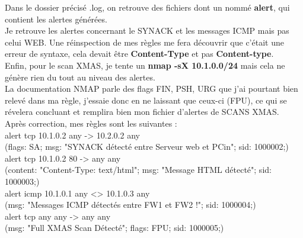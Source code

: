 \documentclass[a4paper,10pt,final,fleqn]{article}
\begin{document}
		Dans le dossier précisé .log, on retrouve des fichiers dont un nommé \textbf{alert}, qui contient les alertes générées.\\
		Je retrouve les alertes concernant le SYNACK et les messages ICMP mais pas celui WEB. Une réinspection de mes règles me fera découvrir que c'était une erreur de syntaxe, cela devait être \textbf{Content-Type} et pas \textbf{Content-type}.\\

		Enfin, pour le scan XMAS, je tente un \textbf{nmap -sX 10.1.0.0/24} mais cela ne génère rien du tout au niveau des alertes.\\
		La documentation NMAP parle des flags FIN, PSH, URG que j'ai pourtant bien relevé dans ma règle, j'essaie donc en ne laissant que ceux-ci (FPU), ce qui se révelera concluant et remplira bien mon fichier d'alertes de SCANS XMAS.\\

		Après correction, mes règles sont les suivantes : \\

		alert tcp 10.1.0.2 any -> 10.2.0.2 any\\
		(flags: SA; msg: "SYNACK détecté entre Serveur web et PCin"; sid: 1000002;)\\

		alert tcp 10.1.0.2 80 -> any any\\
		(content: "Content-Type: text/html"; msg: "Message HTML détecté"; sid: 1000003;)\\

		alert icmp 10.1.0.1 any <> 10.1.0.3 any\\
		(msg: "Messages ICMP détectés entre FW1 et FW2 !"; sid: 1000004;)\\

		alert tcp any any -> any any \\
		(msg: "Full XMAS Scan Détecté"; flags: FPU; sid: 1000005;)\\
\end{document}
